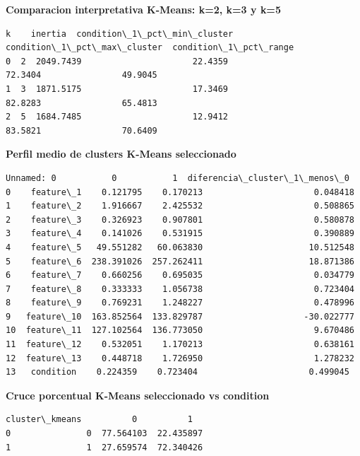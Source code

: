 \documentclass[11pt]{article}
\begin{document}
    
    \textbf{Comparacion interpretativa K-Means: k=2, k=3 y k=5}

    
    
    \begin{Verbatim}[commandchars=\\\{\}]
   k    inertia  condition\_1\_pct\_min\_cluster  condition\_1\_pct\_max\_cluster  condition\_1\_pct\_range
0  2  2049.7439                      22.4359                      72.3404                49.9045
1  3  1871.5175                      17.3469                      82.8283                65.4813
2  5  1684.7485                      12.9412                      83.5821                70.6409
    \end{Verbatim}

    
    \textbf{Perfil medio de clusters K-Means seleccionado}

    
    
    \begin{Verbatim}[commandchars=\\\{\}]
    Unnamed: 0           0           1  diferencia\_cluster\_1\_menos\_0
0    feature\_1    0.121795    0.170213                      0.048418
1    feature\_2    1.916667    2.425532                      0.508865
2    feature\_3    0.326923    0.907801                      0.580878
3    feature\_4    0.141026    0.531915                      0.390889
4    feature\_5   49.551282   60.063830                     10.512548
5    feature\_6  238.391026  257.262411                     18.871386
6    feature\_7    0.660256    0.695035                      0.034779
7    feature\_8    0.333333    1.056738                      0.723404
8    feature\_9    0.769231    1.248227                      0.478996
9   feature\_10  163.852564  133.829787                    -30.022777
10  feature\_11  127.102564  136.773050                      9.670486
11  feature\_12    0.532051    1.170213                      0.638161
12  feature\_13    0.448718    1.726950                      1.278232
13   condition    0.224359    0.723404                      0.499045
    \end{Verbatim}

    
    \textbf{Cruce porcentual K-Means seleccionado vs condition}

    
    
    \begin{Verbatim}[commandchars=\\\{\}]
   cluster\_kmeans          0          1
0               0  77.564103  22.435897
1               1  27.659574  72.340426
    \end{Verbatim}
\end{document}
